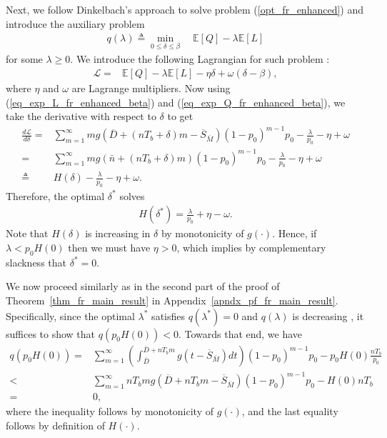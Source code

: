 \documentclass[12pt,journal,onecolumn]{IEEEtran}
\begin{document}
Next, we follow Dinkelbach's approach \cite{dinkelbach-fractional-prog} to solve problem (\ref{opt_fr_enhanced}) and introduce the auxiliary problem
\begin{align}
q(\lambda)\triangleq\min_{0\leq\delta\leq\beta}\quad\mathbb{E}[Q]-\lambda\mathbb{E}[L]
\end{align}
for some $\lambda\geq0$. We introduce the following Lagrangian for such problem \cite{boyd}:
\begin{align}
\mathcal{L}=&\mathbb{E}[Q]-\lambda\mathbb{E}[L]-\eta\delta+\omega(\delta-\beta),
\end{align}
where $\eta$ and $\omega$ are Lagrange multipliers. Now using (\ref{eq_exp_L_fr_enhanced_beta}) and (\ref{eq_exp_Q_fr_enhanced_beta}), we take the derivative with respect to $\delta$ to get
\begin{align}
\frac{d\mathcal{L}}{d\delta}=&\sum_{m=1}^\infty mg\left(\overline{D}+\left(nT_b+\delta\right)m-\overline{S}_{\bar{M}}\right)(1-p_0)^{m-1}p_0-\frac{\lambda}{p_0}-\eta+\omega \\
=&\sum_{m=1}^\infty mg\left(\bar{n}+\left(nT_b+\delta\right)m\right)(1-p_0)^{m-1}p_0-\frac{\lambda}{p_0}-\eta+\omega \\
\triangleq&H(\delta)-\frac{\lambda}{p_0}-\eta+\omega.
\end{align} 
Therefore, the optimal $\delta^*$ solves
\begin{align}
H\left(\delta^*\right)=\frac{\lambda}{p_0}+\eta-\omega.
\end{align}
Note that $H(\delta)$ is increasing in $\delta$ by monotonicity of $g(\cdot)$. Hence, if $\lambda<p_0H(0)$ then we must have $\eta>0$, which implies by complementary slackness that $\delta^*=0$.

We now proceed similarly as in the second part of the proof of Theorem~\ref{thm_fr_main_result} in Appendix~\ref{apndx_pf_fr_main_result}. Specifically, since the optimal $\lambda^*$ satisfies $q(\lambda^*)=0$ and $q(\lambda)$ is decreasing \cite{dinkelbach-fractional-prog}, it suffices to show that $q\left(p_0H(0)\right)<0$. Towards that end, we have
\begin{align}
q\left(p_0H(0)\right)=&\sum_{m=1}^\infty\left(\int_{\overline{D}}^{\overline{D}+nT_bm}g\left(t-\overline{S}_{\bar{M}}\right)dt\right)(1-p_0)^{m-1}p_0-p_0H(0)\frac{nT_b}{p_0} \\
<&\sum_{m=1}^\infty nT_bmg\left(\overline{D}+nT_bm-\overline{S}_{\bar{M}}\right)(1-p_0)^{m-1}p_0-H(0)nT_b \\
=&0,
\end{align}
where the inequality follows by monotonicity of $g(\cdot)$, and the last equality follows by definition of $H(\cdot)$.
\end{document}
